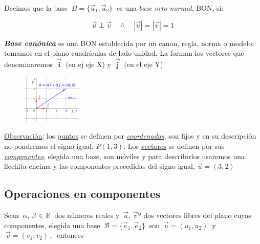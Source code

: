 \vspace{5mm}

\begin{definition}[ BON]

Decimos que la base $\ B=\{\vec u_1, \vec u_2\} \ $ es una \emph{base orto-normal}, BON, si:

$$\vec u \perp \vec v \quad \wedge \quad |\vec u|=|\vec v|=1 $$	


\begin{multicols}{2}
\textbf{\emph{Base canónica}} es una BON establecida por un canon, regla, norma o modelo: tomamos en el plano cuadrículas de lado unidad. La forman los vectores que denominaremos $\ \boldsymbol {\vec i} \ $ (en ej eje X) y  $\ \boldsymbol {\vec j} \ $ (en el eje Y)
\begin{figure}[H]
	\centering
	\includegraphics[width=0.25\textwidth]{img-vec/vec09.png}	
\end{figure}
\end{multicols}
\end{definition}

\underline{Observación}: los \underline{puntos} se definen por 	\underline{\emph{coordenadas}}, son fijos y en su descripción no pondremos el signo igual, $P(1,3)$. Los \underline{vectores} se definen por sus \underline{\emph{componentes}}, elegida una base, son móviles y para describirlos usaremos una flechita encima y las componentes precedidas del signo igual, $\vec u=(3,2)$

\vspace{0.5cm}

\subsection{Operaciones en componentes}
\vspace{0.5cm}

Sean $\ \alpha, \, \beta \, \in \mathbb R\ $ dos números reales y $\ \vec u, \ \vec vº $ dos vectores libres del plano cuyas componentes, elegida una base $\ \mathcal B=\{\vec e_1, \vec e_2\} \ $ son $\ \vec u=(u_1,u_2)\ $ y $\ \vec v=(v_1,v_2)\, , \  $ entonces

